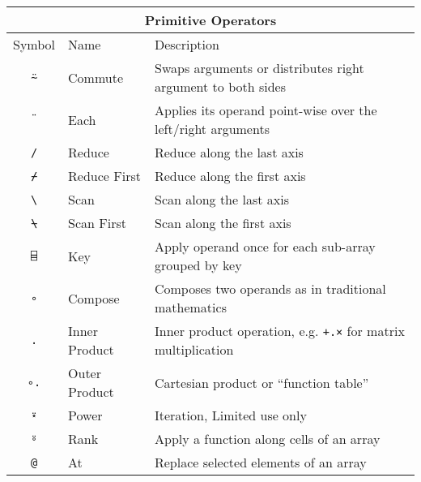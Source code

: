 \documentclass[numbers,10pt,preprint]{sigplanconf}
\begin{document}
\begin{center}
\begin{tabular}{cll}
\toprule
\multicolumn{3}{c}{Primitive Operators} \\ 
\midrule
Symbol     & Name & Description \\
\midrule
\texttt{⍨} & Commute & Swaps arguments or distributes
 right argument to both sides \\
\texttt{¨} & Each & Applies its operand point-wise over the left/right
 arguments \\
\texttt{/} & Reduce & Reduce along the last axis \\
\texttt{⌿} & Reduce First & Reduce along the first axis \\
\texttt{\textbackslash} & Scan & Scan along the last axis \\
\texttt{⍀} & Scan First & Scan along the first axis \\
\texttt{⌸} & Key & Apply operand once for each sub-array grouped by key \\
\texttt{∘} & Compose & Composes two operands as in traditional mathematics \\
\texttt{.} & Inner Product & Inner product operation, e.g.
 \texttt{+.×} for matrix multiplication \\
\texttt{∘.} & Outer Product & Cartesian product or ``function table'' \\
\texttt{⍣} & Power & Iteration, Limited use only \\
\texttt{⍤} & Rank & Apply a function along cells of an array \\
\texttt{@} & At & Replace selected elements of an array \\
\end{tabular}
\end{center}
\end{document}
